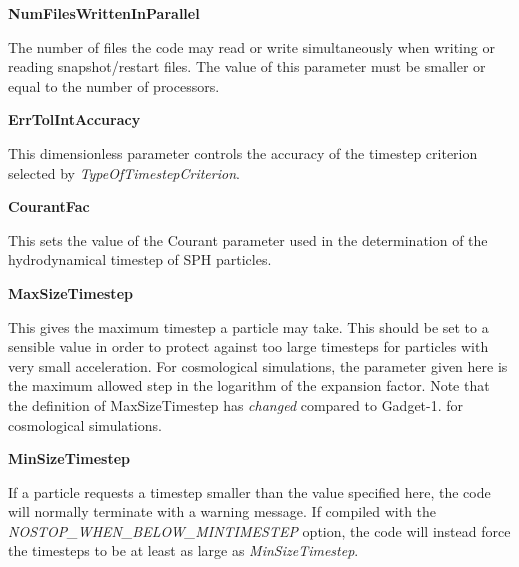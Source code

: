 \begin{DoxyItemize}
\item {\bfseries \-Num\-Files\-Written\-In\-Parallel} \par
 \-The number of files the code may read or write simultaneously when writing or reading snapshot/restart files. \-The value of this parameter must be smaller or equal to the number of processors.
\end{DoxyItemize}


\begin{DoxyItemize}
\item {\bfseries \-Err\-Tol\-Int\-Accuracy} \par
 \-This dimensionless parameter controls the accuracy of the timestep criterion selected by {\itshape \-Type\-Of\-Timestep\-Criterion\/}.
\end{DoxyItemize}


\begin{DoxyItemize}
\item {\bfseries \-Courant\-Fac} \par
 \-This sets the value of the \-Courant parameter used in the determination of the hydrodynamical timestep of \-S\-P\-H particles.
\end{DoxyItemize}


\begin{DoxyItemize}
\item {\bfseries \-Max\-Size\-Timestep} \par
 \-This gives the maximum timestep a particle may take. \-This should be set to a sensible value in order to protect against too large timesteps for particles with very small acceleration. \-For cosmological simulations, the parameter given here is the maximum allowed step in the logarithm of the expansion factor. \-Note that the definition of \-Max\-Size\-Timestep has {\itshape changed\/} compared to \-Gadget-\/1. for cosmological simulations.
\end{DoxyItemize}


\begin{DoxyItemize}
\item {\bfseries \-Min\-Size\-Timestep} \par
 \-If a particle requests a timestep smaller than the value specified here, the code will normally terminate with a warning message. \-If compiled with the {\itshape \-N\-O\-S\-T\-O\-P\-\_\-\-W\-H\-E\-N\-\_\-\-B\-E\-L\-O\-W\-\_\-\-M\-I\-N\-T\-I\-M\-E\-S\-T\-E\-P\/} option, the code will instead force the timesteps to be at least as large as {\itshape \-Min\-Size\-Timestep\/}.
\end{DoxyItemize}


